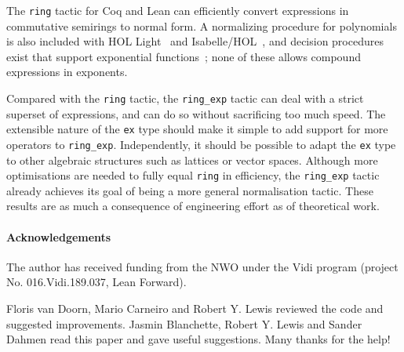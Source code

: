 \documentclass{llncs}
\newcommand{\lean}[1]{\texttt{#1}\xspace} %
\newcommand{\ex}{\lean{ex}}
\newcommand{\ring}{\lean{ring}}
\newcommand{\ringexp}{\lean{ring\_exp}}
\begin{document}
The \ring tactic for Coq and Lean can efficiently convert expressions in commutative semirings to normal form.
A normalizing procedure for polynomials is also included with HOL Light~\cite{hol_light} and Isabelle/HOL~\cite{isabelle_hol},
and decision procedures exist that support exponential functions~\cite{resolution-rcf};
none of these allows compound expressions in exponents.

Compared with the \ring tactic, the \ringexp tactic can deal with a strict superset of expressions,
and can do so without sacrificing too much speed.
The extensible nature of the \ex type should make it simple to add support for more operators to \ringexp.
Independently, it should be possible to adapt the \ex type to other algebraic structures
such as lattices or vector spaces.
Although more optimisations are needed to fully equal \ring in efficiency,
the \ringexp tactic already achieves its goal of being a more general normalisation tactic.
These results are as much a consequence of engineering effort as of theoretical work.


\paragraph{Acknowledgements}
The author has received funding from the NWO under the Vidi program (project
No. 016.Vidi.189.037, Lean Forward).

Floris van Doorn, Mario Carneiro and Robert Y. Lewis reviewed the code and
suggested improvements.
Jasmin Blanchette, Robert Y. Lewis and Sander Dahmen read this paper and gave useful suggestions.
Many thanks for the help!

\printbibliography
\end{document}
